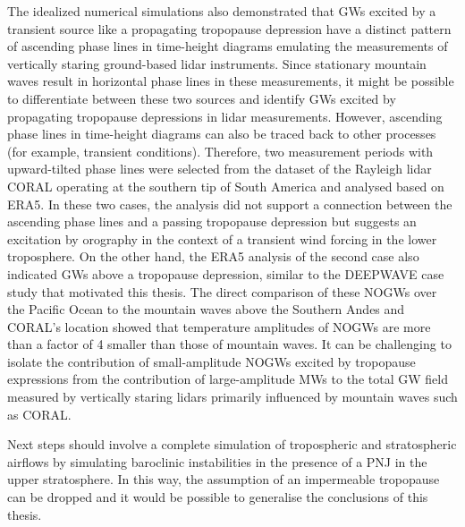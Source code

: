 The idealized numerical simulations also demonstrated that GWs excited by a transient source like a propagating tropopause depression have a distinct pattern of ascending phase lines in time-height diagrams emulating the measurements of vertically staring ground-based lidar instruments. Since stationary mountain waves result in horizontal phase lines in these measurements, it might be possible to differentiate between these two sources and identify GWs excited by propagating tropopause depressions in lidar measurements. However, ascending phase lines in time-height diagrams can also be traced back to other processes (for example, transient conditions). Therefore, two measurement periods with upward-tilted phase lines were selected from the dataset of the Rayleigh lidar CORAL operating at the southern tip of South America and analysed based on ERA5. In these two cases, the analysis did not support a connection between the ascending phase lines and a passing tropopause depression but suggests an excitation by orography in the context of a transient wind forcing in the lower troposphere. On the other hand, the ERA5 analysis of the second case also indicated GWs above a tropopause depression, similar to the DEEPWAVE case study that motivated this thesis. The direct comparison of these NOGWs over the Pacific Ocean to the mountain waves above the Southern Andes and CORAL's location showed that temperature amplitudes of NOGWs are more than a factor of 4 smaller than those of mountain waves. It can be challenging to isolate the contribution of small-amplitude NOGWs excited by tropopause expressions from the contribution of large-amplitude MWs to the total GW field measured by vertically staring lidars primarily influenced by mountain waves such as CORAL.  

Next steps should involve a complete simulation of tropospheric and stratospheric airflows by simulating baroclinic instabilities in the presence of a PNJ in the upper stratosphere. In this way, the assumption of an impermeable tropopause can be dropped and it would be possible to generalise the conclusions of this thesis. 


